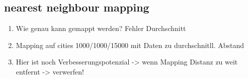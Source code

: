 	\subsection{nearest neighbour mapping}
		\begin{enumerate}
			\item {} Wie genau kann gemappt werden? Fehler Durchschnitt
			\item Mapping auf cities 1000/1000/15000 mit Daten zu durchschnitll. Abstand
			\item Hier ist noch Verbesserungspotenzial -> wenn Mapping Distanz zu weit entfernt -> verwerfen! 
		\end{enumerate} 



\section{}